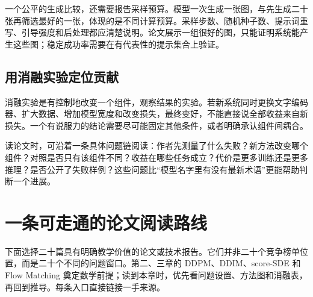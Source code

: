 一个公平的生成比较，还需要报告采样预算。模型一次生成一张图，与先生成二十张再筛选最好的一张，体现的是不同计算预算。采样步数、随机种子数、提示词重写、引导强度和后处理都应清楚说明。论文展示一组很好的图，只能证明系统能产生这些图；稳定成功率需要在有代表性的提示集合上验证。

\subsection{用消融实验定位贡献}

消融实验是有控制地改变一个组件，观察结果的实验。若新系统同时更换文字编码器、扩大数据、增加模型宽度和改变损失，最终变好，不能直接说全部收益来自新损失。一个有说服力的结论需要尽可能固定其他条件，或者明确承认组件间耦合。

读论文时，可沿着一条具体问题链阅读：作者先测量了什么失败？新方法改变哪个组件？对照是否只有该组件不同？收益在哪些任务成立？代价是更多训练还是更多推理？是否公开了失败样例？这些问题比“模型名字里有没有最新术语”更能帮助判断一个进展。

\section{一条可走通的论文阅读路线}
\label{sec:application-reading}

下面选择二十篇具有明确教学价值的论文或技术报告。它们并非二十个竞争榜单位置，而是二十个不同的问题窗口。第二、三章的 DDPM、DDIM、score-SDE 和 Flow Matching 奠定数学前提；读到本章时，优先看问题设置、方法图和消融表，再回到推导。每条入口直接链接一手来源。

